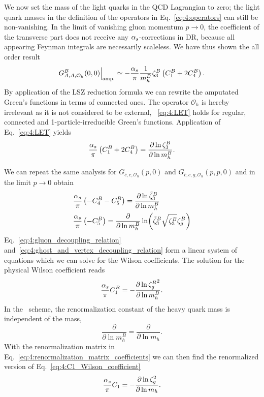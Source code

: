 We now set the mass of the light quarks in the \acs{QCD} Lagrangian to zero; the light quark masses in the definition of the operators in Eq.~\eqref{eq:4:operators} can still be non-vanishing. In the limit of vanishing gluon momentum $p \rightarrow 0$, the coefficient of the transverse part does not receive any $\alpha_s$-corrections in \acs{DR}, because all appearing Feynman integrals are necessarily scaleless. We have thus shown the all order result
\begin{equation}
G_{A,A,\mathcal{O}_h}^B(0, 0)  \Big \vert_{\text{amp.}} \simeq - \frac{\alpha_s}{\pi} \frac{1}{m_h^B} \zeta_3^B \left(C_1^B + 2 C_4^B \right) .
\end{equation}
By application of the LSZ reduction formula we can rewrite the amputated Green's functions in terms of connected ones. The operator $\mathcal{O}_h$ is hereby irrelevant as it is not considered to be external, \ie\ \eqref{eq:4:LET} holds for regular, connected and 1-particle-irreducible Green's functions. Application of Eq.~\eqref{eq:4:LET} yields
\begin{equation}
\frac{\alpha_s}{\pi} \left(C_1^B + 2 C_4^B \right) = \frac{\partial \ln \zeta_3^B}{\partial \ln m_h^B}.
\label{eq:4:gluon_decoupling_relation}
\end{equation}

We can repeat the same analysis for $G_{\bar{c}, c, \mathcal{O}_h}(p, 0)$ and $G_{\bar{c}, c, g, \mathcal{O}_h} (p, p, 0)$ and in the limit $p \rightarrow 0$ obtain
\begin{equation}
\begin{split}
&\frac{\alpha_s}{\pi} \left( - C_4^B - C_5^B \right) = \frac{\partial \ln \tilde{\zeta}_3^B}{\partial \ln m_h^B} \\
&\frac{\alpha_s}{\pi} \left( - C_5^B \right) = \frac{\partial}{\partial \ln m_h^B} \ln\!\left(\tilde{\zeta}_3^B \sqrt{\zeta_3^B} \zeta_g^B \right)
\end{split}
\label{eq:4:ghost_and_vertex_decoupling_relation}
\end{equation}
Eq.~\eqref{eq:4:gluon_decoupling_relation} and\ \eqref{eq:4:ghost_and_vertex_decoupling_relation} form a linear system of equations which we can solve for the Wilson coefficients. The solution for the physical Wilson coefficient reads
\begin{equation}
\frac{\alpha_s}{\pi} C_1^B = - \frac{\partial \ln {\zeta_g^{B}}^2}{\partial \ln m_h^B}.
\label{eq:4:C1_Wilson_coefficient}
\end{equation}
In the \MS\ scheme, the renormalization constant of the heavy quark mass is independent of the mass, \ie
\begin{equation}
\frac{\partial}{\partial \ln m_h^B} = \frac{\partial}{\partial \ln m_h}.
\end{equation}
With the renormalization matrix in Eq.~\eqref{eq:4:renormalization_matrix_coefficients} we can then find the renormalized version of Eq.~\eqref{eq:4:C1_Wilson_coefficient}
\begin{equation}
\frac{\alpha_s}{\pi} C_1 = - \frac{\partial \ln \zeta_g^2}{\partial \ln m_h}.
\end{equation}


